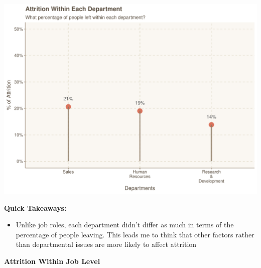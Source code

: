 \documentclass[
]{article}
\providecommand{\tightlist}{%
  \setlength{\itemsep}{0pt}\setlength{\parskip}{0pt}}
\begin{document}
\includegraphics{figures/Attrition Within Each Department-1.pdf}

\textbf{Quick Takeaways:}

\begin{itemize}
\tightlist
\item
  Unlike job roles, each department didn't differ as much in terms of
  the percentage of people leaving. This leads me to think that other
  factors rather than departmental issues are more likely to affect
  attrition
\end{itemize}

\textbf{Attrition Within Job Level}
\end{document}
